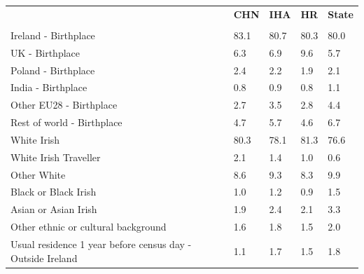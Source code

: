 \documentclass{article}
\begin{document}
\pagebreak
\begin{table}[h]	
\centering
		\begin{tabular}{KTTTT}
  \hline
& \textbf{CHN} & \textbf{IHA} & \textbf{HR}& \textbf{State}\\ 
  \hline
    \\ 
    \hline
Ireland - Birthplace & 83.1& 80.7& 80.3& 80.0\\
UK - Birthplace & 6.3& 6.9& 9.6& 5.7\\
Poland - Birthplace & 2.4& 2.2& 1.9& 2.1\\
India - Birthplace & 0.8& 0.9& 0.8& 1.1\\
Other EU28 - Birthplace & 2.7& 3.5& 2.8& 4.4\\
Rest of world - Birthplace & 4.7& 5.7& 4.6& 6.7\\
    \hline
White Irish & 80.3& 78.1& 81.3& 76.6\\
White Irish Traveller & 2.1& 1.4& 1.0& 0.6\\
Other White & 8.6& 9.3& 8.3& 9.9\\
Black or Black Irish & 1.0& 1.2& 0.9& 1.5\\
Asian or Asian Irish & 1.9& 2.4& 2.1& 3.3\\
Other ethnic or cultural background & 1.6& 1.8& 1.5& 2.0\\
    \hline
Usual residence 1 year before census day - Outside Ireland & 1.1& 1.7& 1.5& 1.8\\


\end{tabular}
\end{table}
\end{document}
